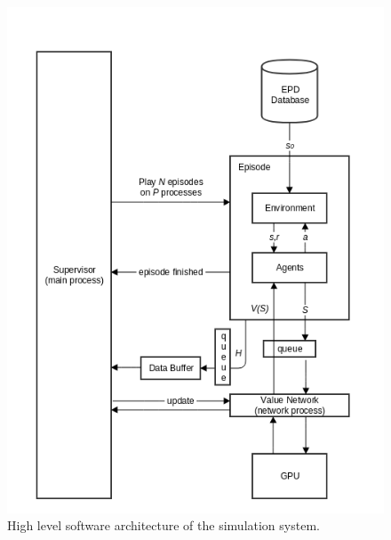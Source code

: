 \begin{figure}
\centering
\includegraphics[scale=0.8]{fig/flow}
\caption{High level software architecture of the simulation system.}
\label{fig:arch}
\end{figure}